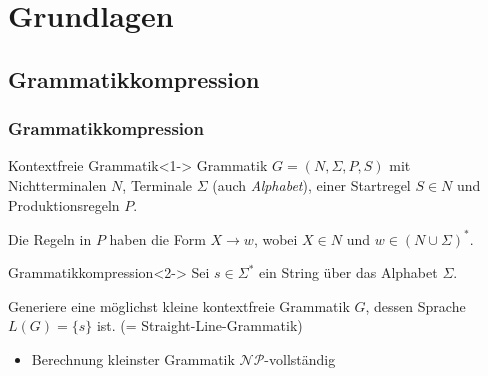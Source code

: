 \section{Grundlagen}

\subsection{Grammatikkompression}

\begin{frame}
    \frametitle{Grammatikkompression}
	

	\begin{block}{Kontextfreie Grammatik}<1->
        Grammatik $G = (N, \Sigma, P, S)$ mit Nichtterminalen $N$, Terminale $\Sigma$ (auch \textit{Alphabet}), einer Startregel $S \in N$ und Produktionsregeln $P$.
		
        Die Regeln in $P$ haben die Form $X \rightarrow w$, wobei $X \in N$ und $w \in (N \cup \Sigma)^*$.
    \end{block}


    \begin{block}{Grammatikkompression}<2->
        Sei $s \in \Sigma^*$ ein String über das Alphabet $\Sigma$. 

        Generiere eine möglichst kleine kontextfreie Grammatik $G$, dessen Sprache $L(G) = \{s\}$ ist. (= Straight-Line-Grammatik)
    \end{block}

	\begin{itemize}
		\item<3->[$\Rightarrow$] Berechnung kleinster Grammatik $\mathcal{NP}$-vollständig \cite{charikar_smallest_2005}
	\end{itemize}
\end{frame}

